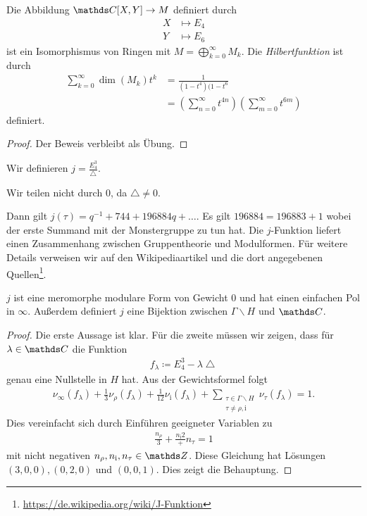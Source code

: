 \begin{thm}
Die Abbildung $\C[X,Y]\to M$ definiert durch
\begin{align*}
X &\mapsto E_4\\
Y &\mapsto E_6
\end{align*}
ist ein Isomorphismus von Ringen mit $M =\bigoplus_{k=0}^\infty M_k$.
Die \emph{Hilbertfunktion} ist durch
\begin{align*}
\sum_{k=0}^\infty \dim(M_k)t^k&=\frac{1}{(1-t^4)(1-t^6}\\
&=\left(\sum_{n=0}^\infty t^{4n}\right) \left(\sum_{m=0}^\infty t^{6m}\right)
\end{align*}
definiert.
\end{thm}
\begin{proof}
Der Beweis verbleibt als Übung.
\end{proof}

\begin{defi}
Wir definieren $j=\frac{E_4^3}{\bigtriangleup}$.
\end{defi}
Wir teilen nicht durch $0$, da $\bigtriangleup\not = 0$.

\begin{bem}
Dann gilt $j(\tau)=q^{-1} +744 + 196884q+ \dots$.
Es gilt $196884=196883+1$ wobei der erste Summand mit der Monstergruppe zu tun hat.
Die $j$-Funktion liefert einen Zusammenhang zwischen Gruppentheorie und Modulformen.
Für weitere Details verweisen wir auf den Wikipediaartikel und die dort angegebenen Quellen\footnote{\url{https://de.wikipedia.org/wiki/J-Funktion}}.
\end{bem}

\begin{prop}
$j$ ist eine meromorphe modulare Form von Gewicht $0$ und hat einen
einfachen Pol in $\infty$.
Außerdem definiert $j$ eine Bijektion zwischen $\Gamma\backslash H$ und $\C$.
\end{prop}
\begin{proof}
Die erste Aussage ist klar.
Für die zweite müssen wir zeigen, dass für $\lambda \in \C$ die Funktion
\begin{align*}
f_\lambda\coloneqq E_4^3-\lambda \bigtriangleup
\end{align*}
genau eine Nullstelle in $H$ hat.
Aus der Gewichtsformel folgt
\begin{align*}
\nu_\infty(f_\lambda)+\frac{1}{3}\nu_\rho(f_\lambda)+\frac{1}{12}\nu_{\mathrm{i}}(f_\lambda)+\sum_{\substack{\tau \in \Gamma\backslash H\\ \tau \not = \rho,\mathrm{i}}} \nu_\tau(f_\lambda)=1.
\end{align*}
Dies vereinfacht sich durch Einführen geeigneter Variablen zu
\begin{align*}
\frac{n_\rho}{3}+\frac{n_{\mathrm{i}}{2}}+n_\tau=1
\end{align*}
mit nicht negativen $n_\rho,n_\mathrm{i},n_\tau \in \Z$.
Diese Gleichung hat Lösungen $(3,0,0),(0,2,0)$ und $(0,0,1)$.
Dies zeigt die Behauptung.
\end{proof}

